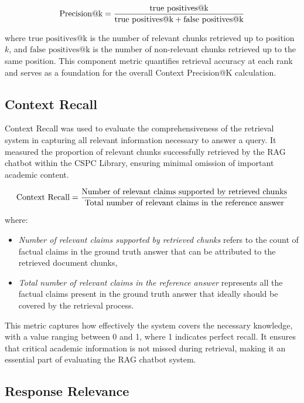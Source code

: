 \begin{refsection}
\begin{equation}
\centering
\text{Precision@k} = 
\frac{
    \text{true positives@k}
}{
    \text{true positives@k} + \text{false positives@k}
}
\end{equation}

where $\text{true positives@k}$ is the number of relevant chunks retrieved up to position $k$, and $\text{false positives@k}$ is the number of non-relevant chunks retrieved up to the same position. This component metric quantifies retrieval accuracy at each rank and serves as a foundation for the overall Context Precision@K calculation.

\newpage
\clearpage
\subsection*{Context Recall}

Context Recall was used to evaluate the comprehensiveness of the retrieval system in capturing all relevant information necessary to answer a query. It measured the proportion of relevant chunks successfully retrieved by the RAG chatbot within the CSPC Library, ensuring minimal omission of important academic content.

\begin{equation}
\centering
\text{Context Recall} = \frac{\text{Number of relevant claims supported by retrieved chunks}}{\text{Total number of relevant claims in the reference answer}}
\end{equation}

where:
\begin{itemize}
    \item \textit{Number of relevant claims supported by retrieved chunks} refers to the count of factual claims in the ground truth answer that can be attributed to the retrieved document chunks,
    \item \textit{Total number of relevant claims in the reference answer} represents all the factual claims present in the ground truth answer that ideally should be covered by the retrieval process.
\end{itemize}

This metric captures how effectively the system covers the necessary knowledge, with a value ranging between 0 and 1, where 1 indicates perfect recall. It ensures that critical academic information is not missed during retrieval, making it an essential part of evaluating the RAG chatbot system.


\subsection*{Response Relevance}


\end{refsection}
